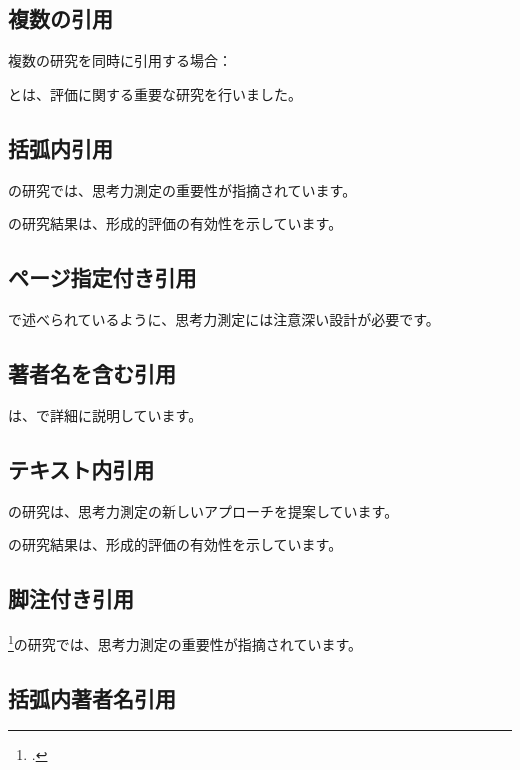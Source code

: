 \documentclass[../main/main.tex]{subfiles}
\begin{document}
\subsection{複数の引用}

複数の研究を同時に引用する場合：

\textcite{arai2020japanese}と\textcite{Black1998-yt}は、評価に関する重要な研究を行いました。

\subsection{括弧内引用}

\parencite{arai2020japanese}の研究では、思考力測定の重要性が指摘されています。

\parencite{Black1998-yt,arai2020japanese}の研究結果は、形成的評価の有効性を示しています。

\subsection{ページ指定付き引用}

\parencite[p.~15]{arai2020japanese}で述べられているように、思考力測定には注意深い設計が必要です。

\subsection{著者名を含む引用}

\textcite{arai2020japanese}は、\parencite[p.~20]{arai2020japanese}で詳細に説明しています。

\subsection{テキスト内引用}

\cite{arai2020japanese}の研究は、思考力測定の新しいアプローチを提案しています。

\cite{Black1998-yt,arai2020japanese}の研究結果は、形成的評価の有効性を示しています。

\subsection{脚注付き引用}

\footcite{arai2020japanese}の研究では、思考力測定の重要性が指摘されています。

\subsection{括弧内著者名引用}
\end{document}
